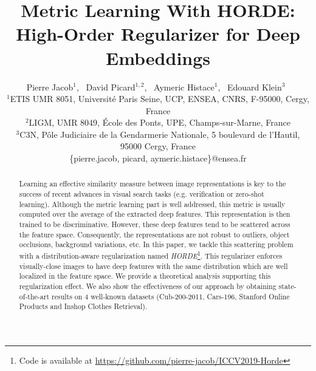 \documentclass[10pt,twocolumn,letterpaper]{article}
\def\ourmethod{\textit{HORDE}}
\begin{document}
\title{Metric Learning With HORDE: High-Order Regularizer for Deep Embeddings}

\author{Pierre Jacob$^1$,~
        David Picard$^{1,2}$,~
        Aymeric Histace$^1$,~
        Edouard Klein$^3$~\\
        $^1$ETIS UMR 8051, Universit{\'e} Paris Seine, UCP, ENSEA, CNRS, F-95000, Cergy, France \\
        $^2$LIGM, UMR 8049, \'Ecole des Ponts, UPE, Champs-sur-Marne, France \\
        $^3$C3N, P\^{o}le Judiciaire de la Gendarmerie Nationale, 5 boulevard de l'Hautil, 95000 Cergy, France\\
        \small \{pierre.jacob, picard, aymeric.histace\}@ensea.fr}

\maketitle

\begin{abstract}
Learning an effective similarity measure between image representations is key to the success of recent advances in visual search tasks (e.g. verification or zero-shot learning).
Although the metric learning part is well addressed, this metric is usually computed over the average of the extracted deep features.
This representation is then trained to be discriminative.
However, these deep features tend to be scattered across the feature space.
Consequently, the representations are not robust to outliers, object occlusions, background variations, etc.
In this paper, we tackle this scattering problem with a distribution-aware regularization named \ourmethod\footnote{Code is available at \url{https://github.com/pierre-jacob/ICCV2019-Horde}}.
This regularizer enforces visually-close images to have deep features with the same distribution which are well localized in the feature space.
We provide a theoretical analysis supporting this regularization effect.
We also show the effectiveness of our approach by obtaining state-of-the-art results on 4 well-known datasets (Cub-200-2011, Cars-196, Stanford Online Products and Inshop Clothes Retrieval).

\end{abstract}
\end{document}
